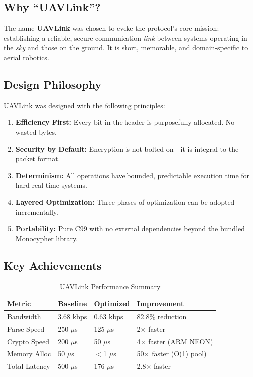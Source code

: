 \documentclass[11pt,a4paper]{article}
\begin{document}
\subsection{Why ``UAVLink''?}

The name \textbf{UAVLink} was chosen to evoke the protocol's core mission: establishing a reliable, secure communication \emph{link} between systems operating in the \emph{sky} and those on the ground. It is short, memorable, and domain-specific to aerial robotics.

\subsection{Design Philosophy}

UAVLink was designed with the following principles:
\begin{enumerate}[noitemsep]
    \item \textbf{Efficiency First:} Every bit in the header is purposefully allocated. No wasted bytes.
    \item \textbf{Security by Default:} Encryption is not bolted on---it is integral to the packet format.
    \item \textbf{Determinism:} All operations have bounded, predictable execution time for hard real-time systems.
    \item \textbf{Layered Optimization:} Three phases of optimization can be adopted incrementally.
    \item \textbf{Portability:} Pure C99 with no external dependencies beyond the bundled Monocypher library.
\end{enumerate}

\subsection{Key Achievements}
\setcounter{table}{0}
\begin{table}[H]
\centering
\begin{tabular}{@{}llll@{}}
\toprule
\textbf{Metric} & \textbf{Baseline} & \textbf{Optimized} & \textbf{Improvement} \\
\midrule
Bandwidth       & 3.68 kbps & 0.63 kbps & 82.8\% reduction \\
Parse Speed     & 250 $\mu$s & 125 $\mu$s & 2$\times$ faster \\
Crypto Speed    & 200 $\mu$s & 50 $\mu$s  & 4$\times$ faster (ARM NEON) \\
Memory Alloc    & 50 $\mu$s  & $<$1 $\mu$s & 50$\times$ faster (O(1) pool) \\
Total Latency   & 500 $\mu$s & 176 $\mu$s & 2.8$\times$ faster \\
\bottomrule
\end{tabular}
\caption{UAVLink Performance Summary}
\end{table}
\end{document}
